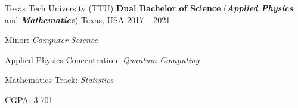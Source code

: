 
\begin{cventries}

  \cventry
  {Texas Tech University (TTU)}
  { \textbf{Dual Bachelor of Science }(\textbf{\textit{Applied Physics}} and \textbf{\textit{Mathematics}}) }
    {Texas, USA}
    {2017 -- 2021}
    {
      \begin{cvitems}
      \item{Minor: \textit{Computer Science}}
        \item{Applied Physics Concentration: \textit{Quantum Computing}}
        \item{Mathematics Track: \textit{Statistics}}
        \item{CGPA: 3.701}
      \end{cvitems}
      \vspace{1em}
    }
\end{cventries}
